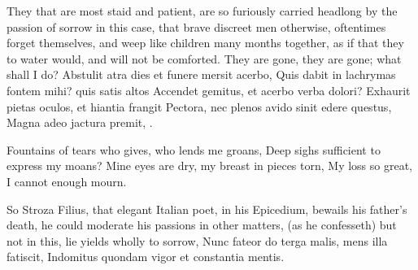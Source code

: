 {%
\clearpage{}
They that are most staid and patient, are so furiously carried headlong
by the passion of sorrow in this case, that brave discreet men
otherwise, oftentimes forget themselves, and weep like children many
months together, as if that they to water would, and will not be
comforted. They are gone, they are gone; what shall I do?
Abstulit atra dies et funere mersit acerbo,
Quis dabit in lachrymas fontem mihi? quis satis altos
Accendet gemitus, et acerbo verba dolori?
Exhaurit pietas oculos, et hiantia frangit
Pectora, nec plenos avido sinit edere questus,
Magna adeo jactura premit, \etc{}.

Fountains of tears who gives, who lends me groans,
Deep sighs sufficient to express my moans?
Mine eyes are dry, my breast in pieces torn,
My loss so great, I cannot enough mourn.

So Stroza Filius, that elegant Italian poet, in his Epicedium, bewails
his father's death, he could moderate his passions in other matters,
(as he confesseth) but not in this, lie yields wholly to sorrow,
Nunc fateor do terga malis, mens illa fatiscit,
Indomitus quondam vigor et constantia mentis.

}
